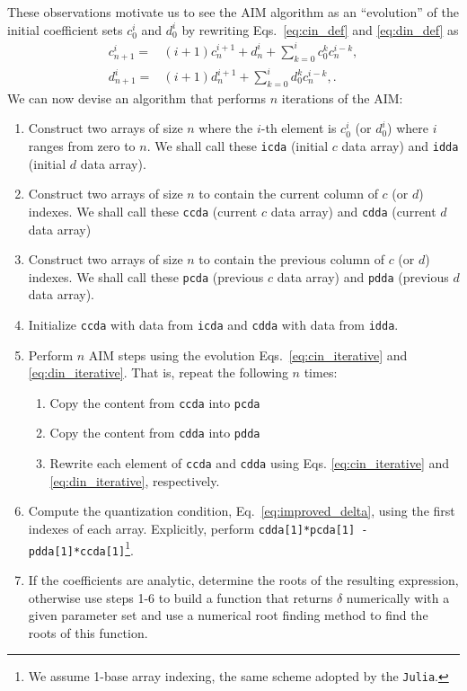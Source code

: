 These observations motivate us to see the AIM algorithm as an ``evolution'' of the initial coefficient sets $c^i_0$ and $d^i_0$ by rewriting Eqs.~\eqref{eq:cin_def} and \eqref{eq:din_def} as
%
\begin{align}
  c^i_{n+1} = & (i+1)c^{i+1}_n + d^i_n + \sum_{k=0}^{i}c^k_0c^{i-k}_n, \label{eq:cin_iterative} \\
  d^i_{n+1} = & (i+1)d^{i+1}_n + \sum_{k=0}^{i}d^k_0c^{i-k}_n, \label{eq:din_iterative}
  .
\end{align}
%
We can now devise an algorithm that performs $n$ iterations of the AIM:
%
\begin{enumerate}
  \item Construct two arrays of size $n$ where the $i$-th element is $c^i_0$ (or $d^i_0$) where $i$ ranges from zero to $n$. We shall call these \texttt{icda} (initial $c$ data array) and \texttt{idda} (initial $d$ data array).

  \item Construct two arrays of size $n$ to contain the current column of $c$ (or $d$) indexes. We shall call these \texttt{ccda} (current $c$ data array) and \texttt{cdda} (current $d$ data array)

  \item Construct two arrays of size $n$ to contain the previous column of $c$ (or $d$) indexes. We shall call these \texttt{pcda} (previous $c$ data array) and \texttt{pdda} (previous $d$ data array).

  \item Initialize \texttt{ccda} with data from \texttt{icda} and \texttt{cdda} with data from \texttt{idda}.

  \item Perform $n$ AIM steps using the evolution Eqs.~\eqref{eq:cin_iterative} and \eqref{eq:din_iterative}. That is, repeat the following $n$ times:
        \begin{enumerate}
          \item Copy the content from \texttt{ccda} into \texttt{pcda}
          \item Copy the content from \texttt{cdda} into \texttt{pdda}
          \item Rewrite each element of \texttt{ccda} and \texttt{cdda} using Eqs. \eqref{eq:cin_iterative} and \eqref{eq:din_iterative}, respectively.
        \end{enumerate}

  \item Compute the quantization condition, Eq.~\eqref{eq:improved_delta}, using the first indexes of each array. Explicitly, perform \texttt{cdda[1]*pcda[1] - pdda[1]*ccda[1]}\footnote{We assume 1-base array indexing, the same scheme adopted by the \texttt{Julia}.}.

  \item If the coefficients are analytic, determine the roots of the resulting expression, otherwise use steps 1-6 to build a function that returns $\delta$ numerically with a given parameter set and use a numerical root finding method to find the roots of this function.
\end{enumerate}
